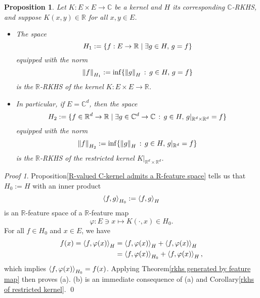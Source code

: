 \documentclass[a4paper,12pt]{article}
\newtheorem{prp}[thm]{Proposition}
\theoremstyle{remark}
\newtheorem*{prf}{Proof}
\theoremstyle{definition}
\theoremstyle{definition}
\theoremstyle{definition}
\newcommand{\ip}[2]{\left<#1, #2 \right>}
\newcommand{\norm}[1]{\left\| #1 \right\|}
\let\Re\relax
\DeclareMathOperator{\Re}{Re}
\let\Im\relax
\DeclareMathOperator{\Im}{Im}
\begin{document}
\begin{prp}
	Let \( K: E \times E \to \mathbb{C} \) be a kernel and \( H \) its corresponding \( \mathbb{C} \)-RKHS, and suppose \( K(x,y) \in \mathbb{R} \) for all \( x, y \in E \).
	\begin{itemize}
		\item[(a)] The space
		      \begin{equation*}
			      H_1:=\{f:E \to \mathbb{R} \mid \exists g \in H,\,\Re g = f\}
		      \end{equation*}
		      equipped with the norm
		      \begin{equation*}
			      \norm{f}_{H_1} := \inf \{\norm{g}_H\,:\, g \in H,\,\Re g = f\}
		      \end{equation*}
		      is the \( \mathbb{R} \)-RKHS of the kernel \( K:E \times E \to \mathbb{R} \).

		\item[(b)] In particular, if \( E =\mathbb{C}^d \), then the space
		      \begin{equation*}
			      H_2:=\{f \in \mathbb{R}^d \to \mathbb{R} \mid \exists g \in \mathbb{C}^d \to \mathbb{C}\,:\, g \in H,\,\Re g|_{\mathbb{R}^d \times \mathbb{R}^d} =f \}
		      \end{equation*}
		      equipped with the norm
		      \begin{equation*}
			      \norm{f}_{H_2} := \inf \{\norm{g}_H \,:\, g \in H,\,\Re g|_{\mathbb{R}^d}=f\}
		      \end{equation*}
		      is the \( \mathbb{R} \)-RKHS of the restricted kernel \( K|_{\mathbb{R}^d \times \mathbb{R}^d} \).
	\end{itemize}
\end{prp}
\begin{prf}
	Proposition\ref{R-valued C-kernel admits a R-feature space} tells us that \( H_0:=H \) with an inner product
	\begin{equation*}
		\ip{f}{g}_{H_0}:= \Re \ip{f}{g}_H
	\end{equation*}
	is an \( \mathbb{R} \)-feature space of a \( \mathbb{R} \)-feature map
	\begin{equation*}
		\varphi:E \ni x \mapsto K(\cdot ,x) \in H_0.
	\end{equation*}
	For all \( f \in H_0 \) and \( x \in E \), we have
	\begin{equation*}
		\begin{aligned}
			f(x) = \ip{f}{\varphi(x)}_H
			 & = \Re \ip{f}{\varphi(x)}_H + \Im \ip{f}{\varphi(x)}_H  \\
			 & = \ip{f}{\varphi(x)}_{H_0} + \Im \ip{f}{\varphi(x)}_H,
		\end{aligned}
	\end{equation*}
	which implies \( \ip{f}{\varphi(x)}_{H_0}= \Re f(x) \). Applying Theorem\ref{rkhs generated by feature map} then proves (a). (b) is an immediate consequence of (a) and Corollary\ref{rkhs of restricted kernel}.
	\qed\end{prf}
\end{document}
